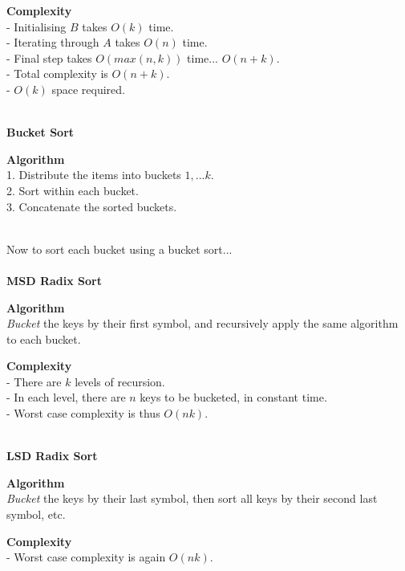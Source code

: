 \documentclass{article}
\begin{document}
\begin{tcolorbox}
    \textbf{Complexity} \\
    - Initialising $B$ takes $O(k)$ time. \\
    - Iterating through $A$ takes $O(n)$ time. \\
    - Final step takes $O(max(n, k))$ time... $O(n + k)$. \\
    - Total complexity is $O(n + k)$. \\
    - $O(k)$ space required.
\end{tcolorbox}
~\\
\textbf{Bucket Sort}
\\
\begin{tcolorbox}
    \textbf{Algorithm} \\
    1. Distribute the items into buckets $1,...k$. \\
    2. Sort within each bucket. \\
    3. Concatenate the sorted buckets. \\
\end{tcolorbox}
~\\
Now to sort each bucket using a bucket sort...
\\\\
\textbf{MSD Radix Sort}
\\
\begin{tcolorbox}
    \textbf{Algorithm} \\
    \emph{Bucket} the keys by their first symbol, and recursively apply the same algorithm to each bucket.
\end{tcolorbox}
\begin{tcolorbox}
    \textbf{Complexity} \\
    - There are $k$ levels of recursion. \\
    - In each level, there are $n$ keys to be bucketed, in constant time. \\
    - Worst case complexity is thus $O(nk)$.
\end{tcolorbox}
~\\
\textbf{LSD Radix Sort}
\\
\begin{tcolorbox}
    \textbf{Algorithm} \\
    \emph{Bucket} the keys by their last symbol, then sort all keys by their second last symbol, etc.
\end{tcolorbox}
\begin{tcolorbox}
    \textbf{Complexity} \\
    - Worst case complexity is again $O(nk)$.
\end{tcolorbox}
\end{document}
